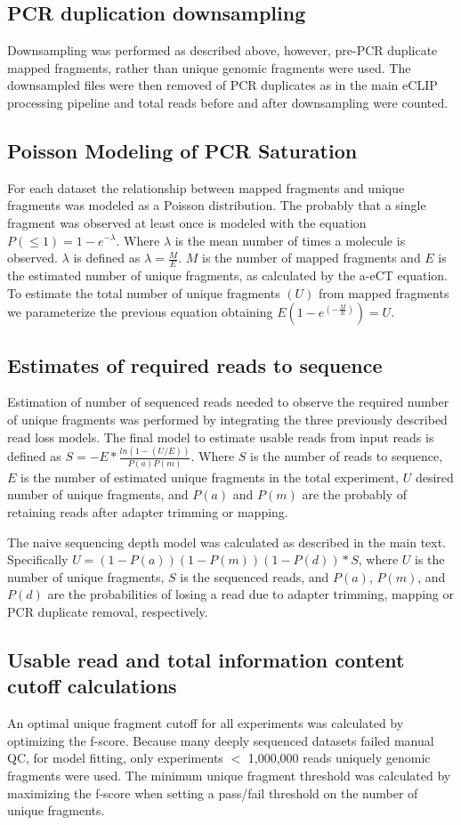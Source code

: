 \subsection{PCR duplication downsampling}
Downsampling was performed as described above, however, pre-PCR duplicate mapped fragments, rather than unique genomic fragments were used. The downsampled files were then removed of PCR duplicates as in the main eCLIP processing pipeline and total reads before and after downsampling were counted.

\subsection{Poisson Modeling of PCR Saturation}
For each dataset the relationship between mapped fragments and unique fragments was modeled as a Poisson distribution. The probably that a single fragment was observed at least once is modeled with the equation $P(\leq1)=1-e^{-\lambda}$. Where $\lambda$ is the mean number of times a molecule is observed. $\lambda$ is defined as $\lambda=\frac{M}{E}$. $M$ is the number of mapped fragments and $E$ is the estimated number of unique fragments, as calculated by the a-eCT equation. To estimate the total number of unique fragments $(U)$ from mapped fragments we parameterize the previous equation obtaining $E(1-e^{(-\frac{M}{E})})=U$.

\subsection{Estimates of required reads to sequence}
Estimation of number of sequenced reads needed to observe the required number of unique fragments was performed by integrating the three previously described read loss models. The final model to estimate usable reads from input reads is defined as $S=-E*\frac{ln(1-(U/E))}{P(a)P(m)}$. Where $S$ is the number of reads to sequence, $E$ is the number of estimated unique fragments in the total experiment, $U$ desired number of unique fragments, and $P(a)$ and $P(m)$ are the probably of retaining reads after adapter trimming or mapping.

The naive sequencing depth model was calculated as described in the main text. Specifically $U=(1-P(a))(1-P(m))(1-P(d))*S$, where $U$ is the number of unique fragments, $S$ is the sequenced reads, and $P(a)$, $P(m)$, and $P(d)$ are the probabilities of losing a read due to adapter trimming, mapping or PCR duplicate removal, respectively.

\subsection{Usable read and total information content cutoff calculations}
An optimal unique fragment cutoff for all experiments was calculated by optimizing the f-score. Because many deeply sequenced datasets failed manual QC, for model fitting, only experiments $<$ 1,000,000 reads uniquely genomic fragments were used. The minimum unique fragment threshold was calculated by maximizing the f-score when setting a pass/fail threshold on the number of unique fragments.

